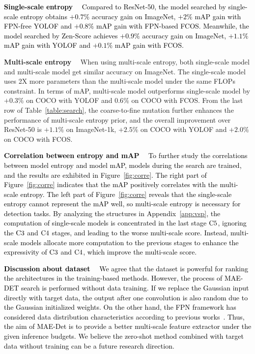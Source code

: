 \documentclass[nohyperref]{article}
\theoremstyle{plain}
\theoremstyle{definition}
\theoremstyle{remark}
\begin{document}
\noindent\textcolor{black}{\textbf{Single-scale entropy}$\quad$ 
Compared to ResNet-50, the model searched by single-scale entropy obtains $+0.7\%$ accuracy gain on ImageNet, $+2\%$ mAP gain with FPN-free YOLOF and $+0.8\%$ mAP gain with FPN-based FCOS. Meanwhile, the model searched by Zen-Score achieves $+0.9\%$ accuracy gain on ImageNet, $+1.1\%$ mAP gain with YOLOF and $+0.1\%$ mAP gain with FCOS.}

\noindent\textbf{Multi-scale entropy}$\quad$ When using multi-scale entropy, both single-scale model and multi-scale model get similar accuracy on ImageNet. The single-scale model uses 2X more parameters than the multi-scale model under the same FLOPs constraint. In terms of mAP, multi-scale model outperforms single-scale model by $+0.3\%$ on COCO with YOLOF and $0.6\%$ on COCO with FCOS. From the last row of Table~\ref{table:search}, the coarse-to-fine mutation further enhances the performance of multi-scale entropy prior, and the overall improvement over ResNet-50 is $+1.1\%$ on ImageNet-1k, $+2.5\%$ on COCO with YOLOF and $+2.0\%$ on COCO with FCOS.


\noindent\textcolor{black}{\textbf{Correlation between entropy and mAP}$\quad$ 
To further study the correlations between model entropy and model mAP, models during the search are trained, and the results are exhibited in Figure~\ref{fig:corre}. 
The right part of Figure~\ref{fig:corre} indicates that the mAP positively correlates with the multi-scale entropy.
The left part of Figure~\ref{fig:corre} reveals that the single-scale entropy cannot represent the mAP well, so multi-scale entropy is necessary for detection tasks.
By analyzing the structures in Appendix~\ref{app:vsp}, the computation of single-scale models is concentrated in the last stage ${\rm C}{5}$, ignoring the ${\rm C}{3}$ and ${\rm C}{4}$ stages, and leading to the worse multi-scale score. Instead, multi-scale models allocate more computation to the previous stages to enhance the expressivity of ${\rm C}{3}$ and ${\rm C}{4}$, which improve the multi-scale score. 
}

\noindent\textcolor{black}{\textbf{Discussion about dataset}$\quad$ 
We agree that the dataset is powerful for ranking the architectures in the training-based methods. 
However, the process of MAE-DET search is performed without data training.
If we replace the Gaussian input directly with target data, the output after one convolution is also random due to the Gaussian initialized weights. On the other hand, the FPN framework has considered data distribution characteristics according to previous works~\cite{fpn,fcos,gfv2}. Thus, the aim of MAE-Det is to provide a better multi-scale feature extractor under the given inference budgets. We believe the zero-shot method combined with target data without training can be a future research direction.
}
\end{document}
